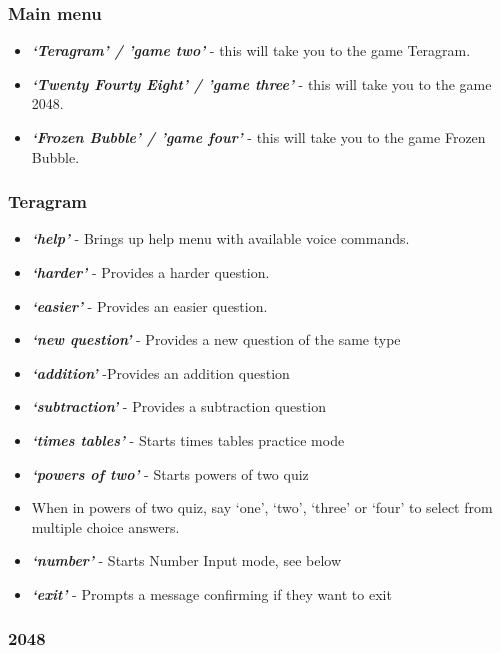 \documentclass[11pt, oneside]{article}
\begin{document}
\subsubsection{Main menu}

\begin{itemize}
  \item {\em\bf`Teragram' / 'game two'}  - this will take you to the game Teragram.
  \item {\em\bf`Twenty Fourty Eight' / 'game three'} - this will take you to the game 2048.
  \item {\em\bf`Frozen Bubble' / 'game four'} - this will take you to the game Frozen Bubble.
\end{itemize}

\subsubsection{Teragram}

\begin{itemize}
  \item {\em\bf`help'} - Brings up help menu with available voice commands. 
  \item {\em\bf`harder'} - Provides a harder question. 
  \item {\em\bf`easier'} - Provides an easier question.
  \item {\em\bf`new question'} - Provides a new question of the same type
  \item {\em\bf`addition'} -Provides an addition question
  \item {\em\bf`subtraction'} - Provides a subtraction question
  \item {\em\bf`times tables'} - Starts times tables practice mode
  \item {\em\bf`powers of two'} - Starts powers of two quiz
    \item {When in powers of two quiz, say `one', `two', `three' or `four' to select from multiple choice answers.}
  \item {\em\bf`number'} - Starts Number Input mode, see below
  \item {\em\bf`exit'} - Prompts a message confirming if they want to exit
 
\end{itemize}

\subsubsection{2048}
\end{document}
